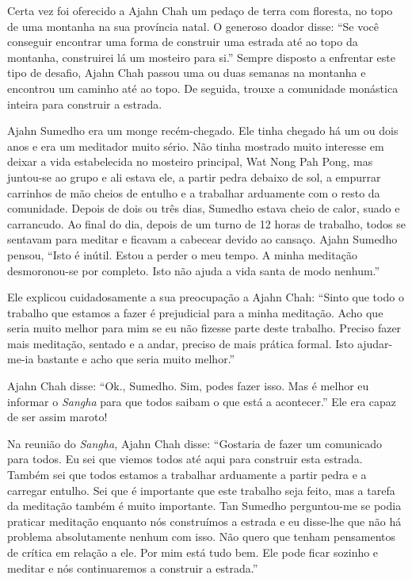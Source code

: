 Certa vez foi oferecido a Ajahn Chah um pedaço de terra com floresta, no
topo de uma montanha na sua província natal. O generoso doador disse:
``Se você conseguir encontrar uma forma de construir uma estrada até ao
topo da montanha, construirei lá um mosteiro para si.'' Sempre disposto
a enfrentar este tipo de desafio, Ajahn Chah passou uma ou duas semanas
na montanha e encontrou um caminho até ao topo. De seguida, trouxe a
comunidade monástica inteira para construir a estrada.  

Ajahn Sumedho era um monge recém-chegado. Ele tinha chegado há um ou
dois anos e era um meditador muito sério. Não tinha mostrado muito
interesse em deixar a vida estabelecida no mosteiro principal, Wat Nong
Pah Pong, mas juntou-se ao grupo e ali estava ele, a partir pedra
debaixo de sol, a empurrar carrinhos de mão cheios de entulho e a
trabalhar arduamente com o resto da comunidade. Depois de dois ou três
dias, Sumedho estava cheio de calor, suado e carrancudo. Ao final do
dia, depois de um turno de 12 horas de trabalho, todos se sentavam para
meditar e ficavam a cabecear devido ao cansaço. Ajahn Sumedho pensou,
``Isto é inútil. Estou a perder o meu tempo. A minha meditação
desmoronou-se por completo. Isto não ajuda a vida santa de modo
nenhum.''

Ele explicou cuidadosamente a sua preocupação a Ajahn Chah: ``Sinto que
todo o trabalho que estamos a fazer é prejudicial para a minha
meditação. Acho que seria muito melhor para mim se eu não fizesse parte
deste trabalho. Preciso fazer mais meditação, sentado e a andar, preciso
de mais prática formal. Isto ajudar-me-ia bastante e acho que seria
muito melhor.''

Ajahn Chah disse: ``Ok., Sumedho. Sim, podes fazer isso. Mas é melhor eu
informar o \emph{Sangha} para que todos saibam o que está a acontecer.''
Ele era capaz de ser assim maroto!

Na reunião do \emph{Sangha,} Ajahn Chah disse: ``Gostaria de fazer um
comunicado para todos. Eu sei que viemos todos até aqui para construir
esta estrada. Também sei que todos estamos a trabalhar arduamente a
partir pedra e a carregar entulho. Sei que é importante que este
trabalho seja feito, mas a tarefa da meditação também é muito
importante. Tan Sumedho perguntou-me se podia praticar meditação
enquanto nós construímos a estrada e eu disse-lhe que não há problema
absolutamente nenhum com isso. Não quero que tenham pensamentos de
crítica em relação a ele. Por mim está tudo bem. Ele pode ficar sozinho
e meditar e nós continuaremos a construir a estrada.''

